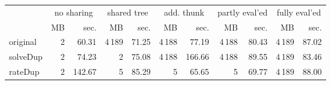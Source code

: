 \makeatletter
\begin{tabular}{lrrrrrrrrrr}
 \\
& \multicolumn{2}{c}{no sharing}& \multicolumn{2}{c}{shared tree}& \multicolumn{2}{c}{add. thunk}& \multicolumn{2}{c}{partly eval'ed}& \multicolumn{2}{c}{fully eval'ed} \\
& MB & sec.& MB & sec.& MB & sec.& MB & sec.& MB & sec. \\ \midrule 
original& {\def\@currentlabel{2}\label{stats:slow:Original:Unshared:mem}2} & {\def\@currentlabel{60.31}\label{stats:slow:Original:Unshared:time}60.31}& {\def\@currentlabel{4\,189}\label{stats:slow:Original:Shared:mem}4\,189} & {\def\@currentlabel{71.25}\label{stats:slow:Original:Shared:time}71.25}& {\def\@currentlabel{4\,188}\label{stats:slow:Original:SharedThunk:mem}4\,188} & {\def\@currentlabel{77.19}\label{stats:slow:Original:SharedThunk:time}77.19}& {\def\@currentlabel{4\,188}\label{stats:slow:Original:SharedEvaled:mem}4\,188} & {\def\@currentlabel{80.43}\label{stats:slow:Original:SharedEvaled:time}80.43}& {\def\@currentlabel{4\,189}\label{stats:slow:Original:SharedFull:mem}4\,189} & {\def\@currentlabel{87.02}\label{stats:slow:Original:SharedFull:time}87.02} \\
\textsf{solveDup}& {\def\@currentlabel{2}\label{stats:slow:SolveDup:Unshared:mem}2} & {\def\@currentlabel{74.23}\label{stats:slow:SolveDup:Unshared:time}74.23}& {\def\@currentlabel{2}\label{stats:slow:SolveDup:Shared:mem}2} & {\def\@currentlabel{75.08}\label{stats:slow:SolveDup:Shared:time}75.08}& {\def\@currentlabel{4\,188}\label{stats:slow:SolveDup:SharedThunk:mem}4\,188} & {\def\@currentlabel{166.66}\label{stats:slow:SolveDup:SharedThunk:time}166.66}& {\def\@currentlabel{4\,188}\label{stats:slow:SolveDup:SharedEvaled:mem}4\,188} & {\def\@currentlabel{89.55}\label{stats:slow:SolveDup:SharedEvaled:time}89.55}& {\def\@currentlabel{4\,189}\label{stats:slow:SolveDup:SharedFull:mem}4\,189} & {\def\@currentlabel{83.46}\label{stats:slow:SolveDup:SharedFull:time}83.46} \\
\textsf{rateDup}& {\def\@currentlabel{2}\label{stats:slow:RateDup:Unshared:mem}2} & {\def\@currentlabel{142.67}\label{stats:slow:RateDup:Unshared:time}142.67}& {\def\@currentlabel{5}\label{stats:slow:RateDup:Shared:mem}5} & {\def\@currentlabel{85.29}\label{stats:slow:RateDup:Shared:time}85.29}& {\def\@currentlabel{5}\label{stats:slow:RateDup:SharedThunk:mem}5} & {\def\@currentlabel{65.65}\label{stats:slow:RateDup:SharedThunk:time}65.65}& {\def\@currentlabel{5}\label{stats:slow:RateDup:SharedEvaled:mem}5} & {\def\@currentlabel{69.77}\label{stats:slow:RateDup:SharedEvaled:time}69.77}& {\def\@currentlabel{4\,189}\label{stats:slow:RateDup:SharedFull:mem}4\,189} & {\def\@currentlabel{88.00}\label{stats:slow:RateDup:SharedFull:time}88.00} \\

\end{tabular}
